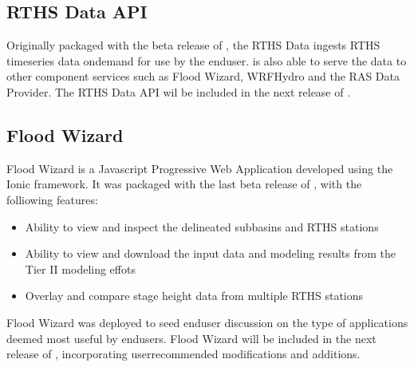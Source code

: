 \documentclass[letterpaper,12pt,english,openany,oneside]{sphinxmanual}
\begin{document}
\subsection{RTHS Data API}
\label{\detokenize{euidev/integrations/index:rths-data-api}}
\sphinxAtStartPar
Originally packaged with the beta release of , the RTHS Data  ingests RTHS time\sphinxhyphen{}series data on\sphinxhyphen{}demand for use by the end\sphinxhyphen{}user.  is also able to serve the data to other component services such as Flood Wizard, WRF\sphinxhyphen{}Hydro and the RAS Data Provider. The  RTHS Data API wil be included in the next release of .


\subsection{Flood Wizard}
\label{\detokenize{euidev/integrations/index:flood-wizard}}
\sphinxAtStartPar
Flood Wizard is a Javascript Progressive Web Application developed using the Ionic framework. It was packaged with the last beta release of , with the folliowing features:
\begin{itemize}
\item {} 
\sphinxAtStartPar
Ability to view and inspect the  delineated sub\sphinxhyphen{}basins and RTHS stations

\item {} 
\sphinxAtStartPar
Ability to view and download the input data and modeling results from the Tier II modeling effots

\item {} 
\sphinxAtStartPar
Overlay and compare stage height data from multiple RTHS stations

\end{itemize}

\sphinxAtStartPar
Flood Wizard was deployed to seed end\sphinxhyphen{}user discussion on the type of applications deemed most useful by end\sphinxhyphen{}users. Flood Wizard will be  included in the next release of , incorporating user\sphinxhyphen{}recommended modifications and additions.
\end{document}
